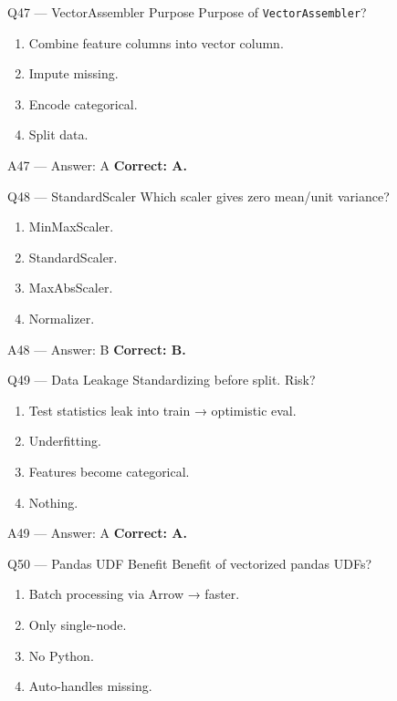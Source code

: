 \documentclass[aspectratio=169,9pt]{beamer}
\begin{document}
	\begin{frame}{Q47 — VectorAssembler Purpose}
		Purpose of \texttt{VectorAssembler}?
		\begin{enumerate}[label=\Alph*.]
			\item Combine feature columns into vector column.
			\item Impute missing.
			\item Encode categorical.
			\item Split data.
		\end{enumerate}
	\end{frame}
	
	\begin{frame}{A47 — Answer: A}
		\textbf{Correct: A.}
	\end{frame}
	
	\begin{frame}{Q48 — StandardScaler}
		Which scaler gives zero mean/unit variance?
		\begin{enumerate}[label=\Alph*.]
			\item MinMaxScaler.
			\item StandardScaler.
			\item MaxAbsScaler.
			\item Normalizer.
		\end{enumerate}
	\end{frame}
	
	\begin{frame}{A48 — Answer: B}
		\textbf{Correct: B.}
	\end{frame}
	
	\begin{frame}{Q49 — Data Leakage}
		Standardizing before split. Risk?
		\begin{enumerate}[label=\Alph*.]
			\item Test statistics leak into train → optimistic eval.
			\item Underfitting.
			\item Features become categorical.
			\item Nothing.
		\end{enumerate}
	\end{frame}
	
	\begin{frame}{A49 — Answer: A}
		\textbf{Correct: A.}
	\end{frame}
	
	\begin{frame}{Q50 — Pandas UDF Benefit}
		Benefit of vectorized pandas UDFs?
		\begin{enumerate}[label=\Alph*.]
			\item Batch processing via Arrow → faster.
			\item Only single-node.
			\item No Python.
			\item Auto-handles missing.
		\end{enumerate}
	\end{frame}
	
\end{document}
